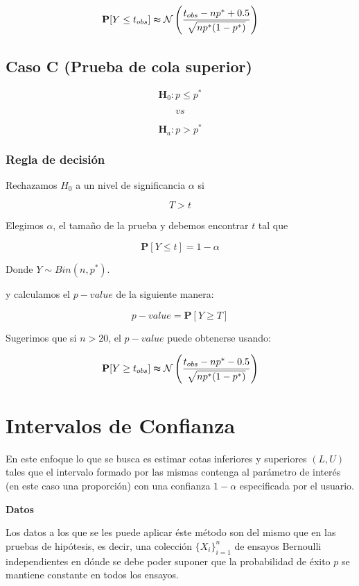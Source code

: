 \documentclass[
  a4paper,
  oneside,
  openany]{book}
\begin{document}
\[\mathbf{P}[Y\leq t_{obs}] \thickapprox \mathcal{N} \left(\frac{t_{obs}-np^*+0.5}{\sqrt{np^*(1-p^*)}}\right)\]

\hypertarget{caso-c-prueba-de-cola-superior}{%
\subsection*{Caso C (Prueba de cola superior)}\label{caso-c-prueba-de-cola-superior}}


\[\textbf{H}_{0}: p  \leq p^*\]

\[vs\]

\[\textbf{H}_{a}: p >p^*\]

\hypertarget{regla-de-decisiuxf3n-2}{%
\subsubsection*{Regla de decisión}\label{regla-de-decisiuxf3n-2}}


Rechazamos \(H_0\) a un nivel de significancia \(\alpha\) si

\[T > t\]

Elegimos \(\alpha\), el tamaño de la prueba y debemos encontrar \(t\) tal que

\[\mathbf{P}[Y \leq t]=1-\alpha\]

Donde \(Y \sim Bin (n,p^*)\).

y calculamos el \(p-value\) de la siguiente manera:

\[p-value= \mathbf{P}[Y \geq T]\]

Sugerimos que si \(n > 20\), el \(p-value\) puede obtenerse usando:

\[\mathbf{P}[Y\geq t_{obs}] \thickapprox \mathcal{N} \left(\frac{t_{obs}-np^*-0.5}{\sqrt{np^*(1-p^*)}}\right)\]

\hypertarget{intervalos-de-confianza}{%
\section{Intervalos de Confianza}\label{intervalos-de-confianza}}

En este enfoque lo que se busca es estimar cotas inferiores y superiores \((L,U)\) tales que el intervalo formado por las mismas contenga al parámetro de interés (en este caso una proporción) con una confianza \(1-\alpha\) especificada por el usuario.

\textbf{Datos}

Los datos a los que se les puede aplicar éste método son del mismo que en las pruebas de hipótesis, es decir, una colección \(\{X_{i}\}_{i=1}^n\) de ensayos Bernoulli independientes en dónde se debe poder suponer que la probabilidad de éxito \(p\) se mantiene constante en todos los ensayos.
\end{document}
